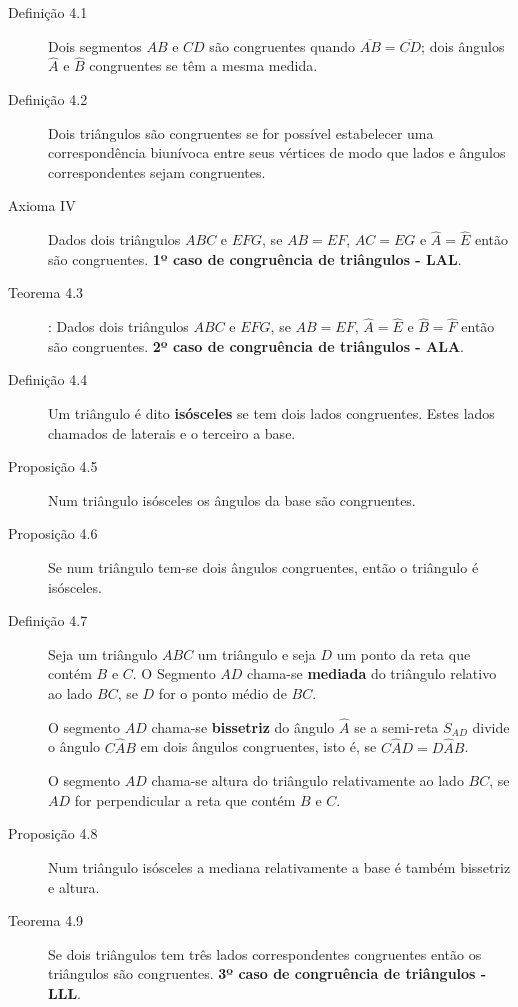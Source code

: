 \begin{description}
  \item[Definição 4.1] Dois segmentos $AB$ e $CD$ são congruentes quando
    $\overline{AB} = \overline{CD}$; dois ângulos $\hat{A}$ e $\hat{B}$
    congruentes se têm a mesma medida.

  \item[Definição 4.2] Dois triângulos são congruentes se for possível
    estabelecer uma correspondência biunívoca entre seus vértices de modo que
    lados e ângulos correspondentes sejam congruentes.

  \item[Axioma IV] Dados dois triângulos $ABC$ e $EFG$, se $AB = EF$, $AC = EG$
    e $\hat{A} = \hat{E}$ então são congruentes.
    \textbf{1º caso de congruência de triângulos - LAL}.

  \item[Teorema 4.3]: Dados dois triângulos $ABC$ e $EFG$, se $AB = EF$,
    $\hat{A} = \hat{E}$ e $\hat{B} = \hat{F}$ então são congruentes.
    \textbf{2º caso de congruência de triângulos - ALA}.

  \item[Definição 4.4] Um triângulo é dito \textbf{isósceles} se tem dois lados
    congruentes. Estes lados chamados de laterais e o terceiro a base.

  \item[Proposição 4.5] Num triângulo isósceles os ângulos da base são
    congruentes.

  \item[Proposição 4.6] Se num triângulo tem-se dois ângulos congruentes,
    então o triângulo é isósceles.

  \item[Definição 4.7] Seja um triângulo $ABC$ um triângulo e seja $D$ um ponto
    da reta que contém $B$ e $C$. O Segmento $AD$ chama-se \textbf{mediada}
    do triângulo relativo ao lado $BC$, se $D$ for o ponto médio de $BC$.

    O segmento $AD$ chama-se \textbf{bissetriz} do ângulo $\hat{A}$ se a
    semi-reta $S_{AD}$ divide o ângulo $C\hat{A}B$ em dois ângulos
    congruentes, isto é, se $C\hat{A}D = D\hat{A}B$.

    O segmento $AD$ chama-se altura do triângulo relativamente ao lado $BC$, se
    $AD$ for perpendicular a reta que contém $B$ e $C$.

  \item[Proposição 4.8] Num triângulo isósceles a mediana relativamente a base
    é também bissetriz e altura.

  \item[Teorema 4.9] Se dois triângulos tem três lados correspondentes
    congruentes então os triângulos são congruentes.
    \textbf{3º caso de congruência de triângulos - LLL}.
\end{description}

